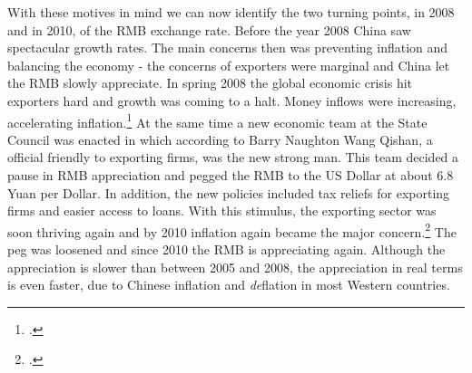 With these motives in mind we can now identify the two turning points, 
in 2008 and in 2010, of the RMB exchange rate. Before the year 2008 
China saw spectacular growth rates. The main concerns then was 
preventing inflation and balancing the economy - the concerns of 
exporters were marginal and China let the RMB slowly appreciate. In 
spring 2008 the global economic crisis hit exporters hard and growth was 
coming to a halt. Money inflows were increasing, accelerating 
inflation.\footnote{\cite{Naughton2008}.} At the same time a new 
economic team at the State Council was enacted in which according to 
Barry Naughton Wang Qishan, a official friendly to exporting firms, was 
the new strong man. This team decided a pause in RMB appreciation and 
pegged the RMB to the US Dollar at about 6.8 Yuan per Dollar. In 
addition, the new policies included tax reliefs for exporting firms and 
easier access to loans. With this stimulus, the exporting sector was 
soon thriving again and by 2010 inflation again became the major 
concern.\footnote{\cite{Naughton2010}.} The peg was loosened and since 
2010 the RMB is appreciating again. Although the appreciation is slower 
than between 2005 and 2008, the appreciation in real terms is even 
faster, due to Chinese inflation and \emph{de}flation in most Western 
countries.
